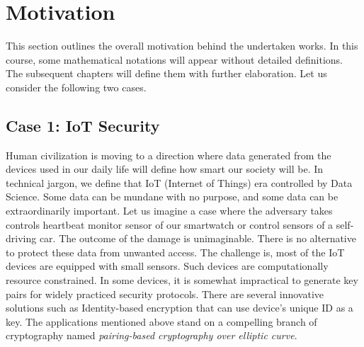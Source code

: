 \section{Motivation}
\label{ch1_sec_motivation}

This section outlines the overall motivation behind the undertaken works.
In this course, some mathematical notations will appear without detailed definitions.
The subsequent chapters will define them with further elaboration.
Let us consider the following two cases.

\subsection*{Case 1: IoT Security}
Human civilization is moving to a direction where data generated from the devices used in our daily life will define how smart our society will be.
In technical jargon, we define that IoT (Internet of Things) era controlled by Data Science.
Some data can be mundane with no purpose, and some data can be extraordinarily important.
Let us imagine a case where the adversary takes controls heartbeat monitor sensor of our smartwatch or control sensors of a self-driving car.
The outcome of the damage is unimaginable. 
There is no alternative to protect these data from unwanted access.
The challenge is, most of the IoT devices are equipped with small sensors.
Such devices are computationally resource constrained.
In some devices, it is somewhat impractical to generate key pairs for widely practiced security protocols.
There are several innovative solutions such as Identity-based encryption that can use device's unique ID as a key.
The applications mentioned above stand on a compelling branch of cryptography named \textit{pairing-based cryptography over elliptic curve}.



